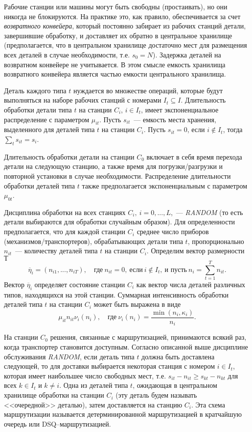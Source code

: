 \documentclass[a4paper,14pt]{extarticle}
\theoremstyle{note}
\begin{document}
Рабочие станции или машины могут быть свободны (простаивать), но они никогда не блокируются. На практике это, как правило, обеспечивается за счет \textit{возвратного конвейера}, который постоянно забирает из рабочих станций детали, завершившие обработку, и доставляет их обратно в центральное хранилище (предполагается, что в центральном хранилище достаточно мест для размещения всех деталей в случае необходимости, т.е. $s_0=N$). Задержка деталей на возвратном конвейере не учитывается. В этом смысле емкость хранилища возвратного конвейера является частью емкости центрального хранилища.

Деталь каждого типа $t$ нуждается во множестве операций, которые будут выполняться на наборе рабочих станций с номерами $I_t \subseteq I$. Длительность обработки детали типа $t$ на станции $C_i$, $i \in I_t$, имеет экспоненциальное распределение с параметром $\mu_{it}$. Пусть $s_{it}$~--- емкость места хранения, выделенного для деталей типа $t$ на станции $C_i$. Пусть $s_{it}=0$, если $i \notin I_t$, тогда $\sum\limits_t s_{it} = s_i$.

Длительность обработки детали на станции $C_0$ включает в себя время перехода детали на следующую станцию, а также время для погрузки/разгрузки и повторной установки в случае необходимости. Распределение длительности обработки деталей типа $t$ также предполагается экспоненциальным с параметром $\mu_{0t}$.

Дисциплина обработки на всех станциях $C_i,~i=0,...,L$,~--- \textit{RANDOM} (то есть детали выбираются для обработки случайным образом). Для определенности предполагается, что для каждой станции $C_i$ среднее число приборов (механизмов/транспортеров), обрабатывающих детали типа $t$, пропорционально $n_{it}$~--- количеству деталей типа $t$ на станции $C_i$. Определим вектор размерности $Т$
\begin{equation*}
 \overline{\eta}_i = (n_{i1},...,n_{iT}), \quad \text{где}~ n_{it}=0, ~\text{если}~ i \notin I_t, ~\text{и пусть}~ n_i = \sum_{t=1}^{T} n_{it}.
\end{equation*}
Вектор $\overline{\eta}_i$ определяет состояние станции $C_i$ как вектор числа деталей различных типов, находящихся на этой станции.
Суммарная интенсивность обработки деталей типа $t$ на станции $C_i$ может быть выражена в виде
\begin{equation*}
 \mu_{it} n_{it} \nu_{i}(n_i), \quad \text{где} ~\nu_i(n_i) = \frac{\min(n_i, \kappa_i)}{n_i}.
\end{equation*}

На станции $C_0$ решения, связанные с маршрутизацией, принимаются всякий раз, когда транспортер становится доступным. Согласно описанной выше дисциплине обслуживания \textit{RANDOM}, если деталь типа $t$ должна быть доставлена следующей, то для доставки выбирается некоторая станция с номером $i \in I_t$, которая имеет наибольшее число свободных мест, т.е. $s_{it} - n_{it} \geqslant s_{kt} - n_{kt}$ для всех $k \in I_t$ и $k \neq i$. Одна из деталей типа $t$, ожидающая в центральном хранилище обработки на станции $C_i$ (эту деталь будем называть <<очередной>> деталью), затем доставляется на станцию $C_i$. Эта схема маршрутизации называется детерминированной маршрутизацией в кратчайшую очередь или DSQ--маршрутизацией.
\end{document}
